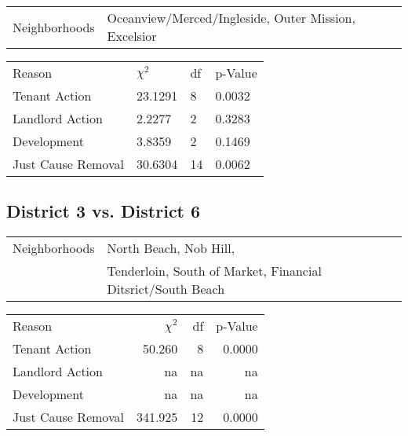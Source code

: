 \documentclass[]{article}
\begin{document}
\begin{table}[h]
	\centering
	\begin{tabular}{l | l}
		Neighborhoods &  Oceanview/Merced/Ingleside, Outer Mission, Excelsior  \\
	\end{tabular}
\end{table}
\FloatBarrier

\begin {table}[h]
\centering
\begin{tabular}{l | l | l | l}
	
	Reason				 &  $\chi ^{2}$ & df & p-Value \\
	Tenant Action 		   &  23.1291  &  8  & 0.0032 \\
	Landlord Action	       &   2.2277 &  2  & 0.3283 \\
	Development			   &  3.8359  &  2  & 0.1469 \\
	Just Cause Removal	   &  30.6304  &  14  & 0.0062 \\
\end{tabular} \newline
\end{table}
\FloatBarrier

\subsection{District 3 vs. District 6}
\begin{table}[h]
\centering
\begin{tabular}{l | l}
Neighborhoods &  North Beach, Nob Hill, 			 \\ 
			  &  Tenderloin, South of Market, Financial Ditsrict/South Beach \\
\end{tabular}
\end{table}

\begin {table}[h]
\centering
\begin{tabular}{l | r | r | r}	
Reason				 &  $\chi ^{2}$ & df    & p-Value   \\
Tenant Action 		 &  50.260      &  8    & 0.0000    \\
Landlord Action	     &  na          &  na   & na        \\
Development			 &  na          &  na   & na        \\
Just Cause Removal	 &  341.925     &  12   & 0.0000    \\
\end{tabular} \newline
\end{table}
\end{document}
